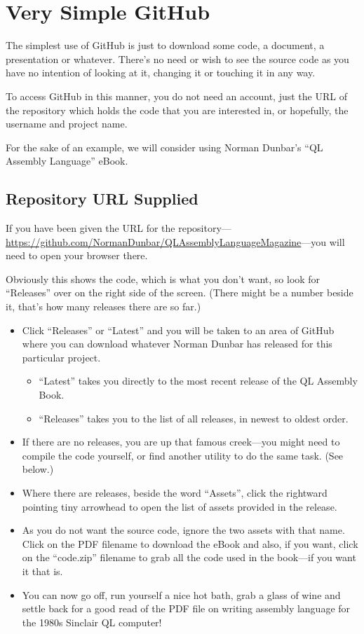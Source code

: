 \chapter{Very Simple GitHub}\label{chapter: Very Simple GitHub}

The simplest use of GitHub is just to download some code, a document, a presentation or whatever. There's no need or wish to see the source code as you have no intention of looking at it, changing it or touching it in any way.

To access GitHub in this manner, you do not need an account, just the URL of the repository which holds the code that you are interested in, or hopefully, the username and project name.

For the sake of an example, we will consider using Norman Dunbar's ``QL Assembly Language'' eBook.

\section{Repository URL Supplied}\label{sect: Repo URL Supplied}


If you have been given the URL for the repository---\url{https://github.com/NormanDunbar/QLAssemblyLanguageMagazine}---you will need to open your browser there.

Obviously this shows the code, which is what you don't want, so look for ``Releases'' over on the right side of the screen. (There might be a number beside it, that's how many releases there are so far.)

\begin{itemize}
    \item Click ``Releases'' or ``Latest'' and you will be taken to an area of GitHub where you can download whatever Norman Dunbar has released for this particular project.
    \begin{itemize}
        \item ``Latest'' takes you directly to the most recent release of the QL Assembly Book.
        \item ``Releases'' takes you to the list of all releases, in newest to oldest order.
    \end{itemize}
    \item If there are no releases, you are up that famous creek---you might need to compile the code yourself, or find another utility to do the same task. (See  below.)
    \item Where there are releases, beside the word ``Assets'', click the rightward pointing tiny arrowhead to open the list of assets provided in the release.
    \item As you do not want the source code, ignore the two assets with that name. Click on the PDF filename to download the eBook and also, if you want, click on the ``code.zip'' filename to grab all the code used in the book---if you want it that is.
    \item You can now go off, run yourself a nice hot bath, grab a glass of wine and settle back for a good read of the PDF file on writing assembly language for the 1980s Sinclair QL computer!
\end{itemize}


